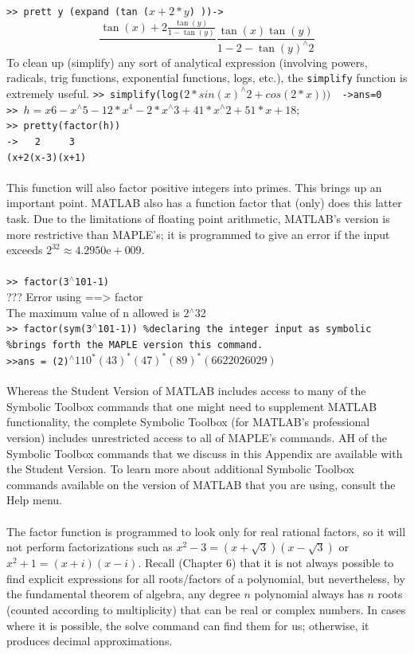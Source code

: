 \documentclass[../main.tex]{subfiles}
\begin{document}
\texttt{>> prett y (expand (tan ($x+2*y$) ))->}
$$
\frac{\tan (x)+2 \frac{\tan (y)}{1-\tan (y)}}{} \frac{\tan (x) \tan (y)}{1-2-\tan (y)^{\wedge}2}
$$
To clean up (simplify) any sort of analytical expression (involving powers, 
radicals, trig functions, exponential functions, logs, etc.), the \texttt{simplify} function 
is extremely useful. 
\texttt{>> simplify(log($2*sin(x)^{\wedge}2+cos(2*x)))$~~->ans=0 }\\
\texttt{>> $h=x 6-x^{\wedge}5-12*x^4-2*x^{\wedge}3+41*x^{\wedge}2+51*x+18;$ }\\
\texttt{>> pretty(factor(h)) }\\
\texttt{->  ~~2 ~~~ 3 }\\
\texttt{(x+2(x-3)(x+1)}\\
\\
This function will also factor positive integers into primes. This brings up an important point. MATLAB also has a function factor that (only) does this latter task. Due to the limitations of floating point arithmetic, MATLAB's version is more restrictive than MAPLE's; it is programmed to give an error if the input exceeds $2^{32} \approx 4.2950 \mathrm{e}+009$.
\\
\\
\texttt{>> factor(3$^{\wedge}$101-1) }\\
??? Error using ==> factor \\
The maximum value of n allowed is 2$^{\wedge}$32\\
\texttt{>> factor(sym(3$^{\wedge}$101-1)) \%declaring the integer input as symbolic 
}\\
\texttt{\%brings forth the MAPLE version this command. 
}\\
\texttt{>>ans = (2)$^{\wedge}110^*(43)^*(47)^*(89)^*(6622026029) $}
\\
\\
Whereas the Student Version of MATLAB includes access to many of the 
Symbolic Toolbox commands that one might need to supplement MATLAB 
functionality, the complete Symbolic Toolbox (for MATLAB's professional 
version) includes unrestricted access to all of MAPLE's commands. AH of the 
Symbolic Toolbox commands that we discuss in this Appendix are available with 
the Student Version. To learn more about additional Symbolic Toolbox 
commands available on the version of MATLAB that you are using, consult the 
Help menu. 
\\
\\
The factor function is programmed to look only for real rational factors, so it will not perform factorizations such as $x^{2}-3=(x+\sqrt{3})(x-\sqrt{3})$ or $x^{2}+1=(x+i)(x-i)$. Recall (Chapter 6) that it is not always possible to find explicit expressions for all roots/factors of a polynomial, but nevertheless, by the fundamental theorem of algebra, any degree $n$ polynomial always has $n$ roots (counted according to multiplicity) that can be real or complex numbers. In cases where it is possible, the solve command can find them for us; otherwise, it produces decimal approximations.
\end{document}
